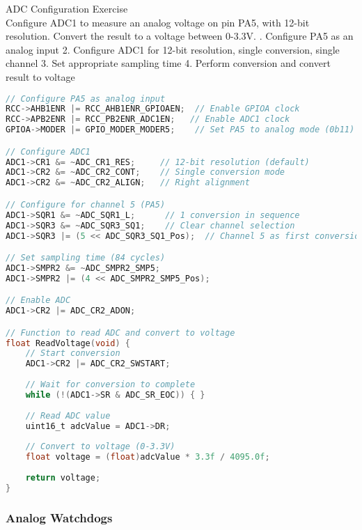 \begin{example2}{ADC Configuration Exercise}\\
Configure ADC1 to measure an analog voltage on pin PA5, with 12-bit resolution. Convert the result to a voltage between 0-3.3V.
. Configure PA5 as an analog input
2. Configure ADC1 for 12-bit resolution, single conversion, single channel
3. Set appropriate sampling time
4. Perform conversion and convert result to voltage

\begin{lstlisting}[language=C, style=basesmol]
// Configure PA5 as analog input
RCC->AHB1ENR |= RCC_AHB1ENR_GPIOAEN;  // Enable GPIOA clock
RCC->APB2ENR |= RCC_PB2ENR_ADC1EN;   // Enable ADC1 clock
GPIOA->MODER |= GPIO_MODER_MODER5;    // Set PA5 to analog mode (0b11)

// Configure ADC1
ADC1->CR1 &= ~ADC_CR1_RES;     // 12-bit resolution (default)
ADC1->CR2 &= ~ADC_CR2_CONT;    // Single conversion mode
ADC1->CR2 &= ~ADC_CR2_ALIGN;   // Right alignment

// Configure for channel 5 (PA5)
ADC1->SQR1 &= ~ADC_SQR1_L;      // 1 conversion in sequence
ADC1->SQR3 &= ~ADC_SQR3_SQ1;    // Clear channel selection
ADC1->SQR3 |= (5 << ADC_SQR3_SQ1_Pos);  // Channel 5 as first conversion

// Set sampling time (84 cycles)
ADC1->SMPR2 &= ~ADC_SMPR2_SMP5;
ADC1->SMPR2 |= (4 << ADC_SMPR2_SMP5_Pos);

// Enable ADC
ADC1->CR2 |= ADC_CR2_ADON;

// Function to read ADC and convert to voltage
float ReadVoltage(void) {
    // Start conversion
    ADC1->CR2 |= ADC_CR2_SWSTART;
    
    // Wait for conversion to complete
    while (!(ADC1->SR & ADC_SR_EOC)) { }
    
    // Read ADC value
    uint16_t adcValue = ADC1->DR;
    
    // Convert to voltage (0-3.3V)
    float voltage = (float)adcValue * 3.3f / 4095.0f;
    
    return voltage;
}
\end{lstlisting}
\end{example2}





\subsubsection{Analog Watchdogs}


